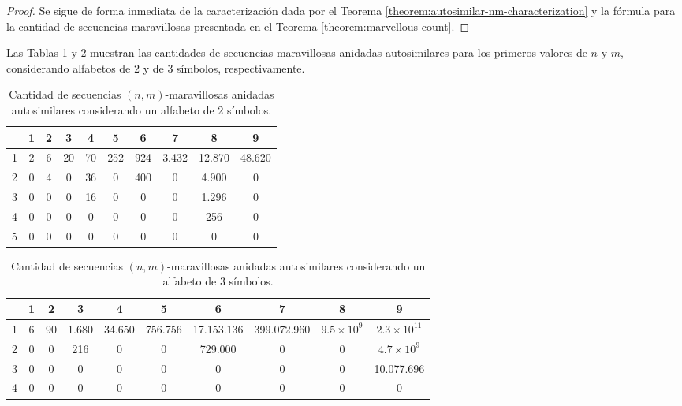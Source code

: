\begin{proof}
	Se sigue de forma inmediata de la caracterización dada por el Teorema
	\ref{theorem:autosimilar-nm-characterization} y la fórmula para la cantidad de
	secuencias maravillosas presentada en el Teorema \ref{theorem:marvellous-count}.
\end{proof}

Las Tablas \ref{table:count-autosimilar-2} y \ref{table:count-autosimilar-3}
muestran las cantidades de secuencias maravillosas anidadas
autosimilares para los primeros valores de $n$ y $m$, considerando alfabetos
de $2$ y de $3$ símbolos, respectivamente.

\begin{table}[H]
	\centering
	\small
	\begin{tabular}{|c|c|c|c|c|c|c|c|c|c|}
		\hline
		\diagbox[width=3em]{$n$}{$m$}	& 1 & 2 & 3  & 4  & 5   & 6   & 7    & 8     & 9     \\
		\hline
		1 & 2 & 6 & 20 & 70 & 252 & 924 & 3.432 & 12.870 & 48.620
		\\ \hline
		2 & 0 & 4 & 0  & 36 & 0   & 400 & 0     & 4.900  & 0     \\
		\hline
		3 & 0 & 0 & 0  & 16 & 0   & 0   & 0     & 1.296  & 0     \\
		\hline
		4 & 0 & 0 & 0  & 0  & 0   & 0   & 0     & 256    & 0     \\
		\hline
		5 & 0 & 0 & 0  & 0  & 0   & 0   & 0     & 0      & 0     \\
		\hline
	\end{tabular}
	\caption{Cantidad de secuencias $(n,m)$-maravillosas anidadas autosimilares
		considerando un alfabeto de $2$ símbolos.}
	\label{table:count-autosimilar-2}
\end{table}

\begin{table}[H]
	\centering
	\small
	\begin{tabular}{|c|c|c|c|c|c|c|c|c|c|}
		\hline
		\diagbox[width=3em]{$n$}{$m$} & 1 & 2 & 3 & 4 & 5 & 6 & 7 & 8 & 9 \\ \hline
		1 & 6 & 90 & 1.680 & 34.650 & 756.756 & 17.153.136 & 399.072.960 & $9.5 \times 10^{9}$ & $2.3 \times 10^{11}$ \\ \hline
		2 & 0 & 0  & 216   & 0      & 0       & 729.000    & 0           & 0             & $4.7 \times 10^{9}$ \\ \hline
		3 & 0 & 0  & 0     & 0      & 0       & 0          & 0           & 0             & 10.077.696    \\ \hline
		4 & 0 & 0  & 0     & 0      & 0       & 0          & 0           & 0             & 0 \\
		\hline
	\end{tabular}
	\caption{Cantidad de secuencias $(n,m)$-maravillosas anidadas autosimilares
		considerando un alfabeto de $3$ símbolos.}
	\label{table:count-autosimilar-3}
\end{table}


